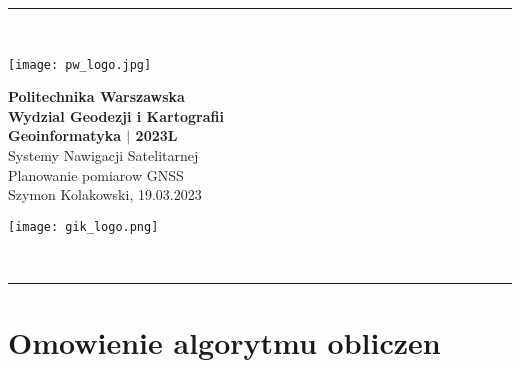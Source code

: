 \documentclass[twocolumn]{article}
\begin{document}
\begin{strip}
\begin{tightcenter}
\rule{17.5cm}{0.1mm}\\[5mm]
    \begin{minipage}{3cm}
    	\begin{center}
    		\texttt{[image: pw\_logo.jpg]}
    	\end{center}
    \end{minipage}\hfill
    \begin{minipage}{10cm}
    	\begin{center}
    	\textbf{\large Politechnika Warszawska}\\[0.1cm]
        \textbf{Wydzial Geodezji i Kartografii}\\[0.1cm]
        \textbf{Geoinformatyka $|$ 2023L}\\[0.1cm]
        Systemy Nawigacji Satelitarnej\\[0.1cm]
        Planowanie pomiarow GNSS\\[0.1cm]
        Szymon Kolakowski, 19.03.2023
    	\end{center}
    \end{minipage}\hfill
    \begin{minipage}{3cm}
    	\begin{center}
    		\texttt{[image: gik\_logo.png]}
    	\end{center}
    \end{minipage}\\[5mm]
\rule{17.5cm}{0.1mm}
\end{tightcenter}
\end{strip}

\section{Omowienie algorytmu obliczen}


\end{document}
